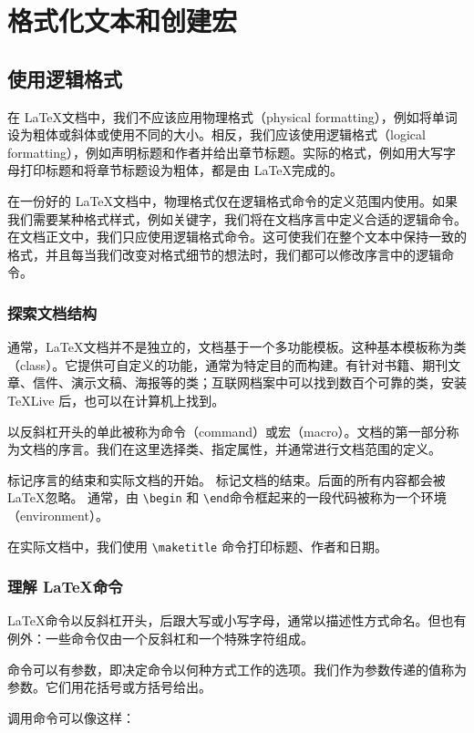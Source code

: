 \chapter{格式化文本和创建宏}
\section{使用逻辑格式}
在 \LaTeX 文档中，我们不应该应用物理格式（physical formatting），例如将单词设为粗体或斜体或使用不同的大小。相反，我们应该使用逻辑格式（logical formatting），例如声明标题和作者并给出章节标题。实际的格式，例如用大写字母打印标题和将章节标题设为粗体，都是由 \LaTeX 完成的。

在一份好的 \LaTeX 文档中，物理格式仅在逻辑格式命令的定义范围内使用。如果我们需要某种格式样式，例如关键字，我们将在文档序言中定义合适的逻辑命令。在文档正文中，我们只应使用逻辑格式命令。这可使我们在整个文本中保持一致的格式，并且每当我们改变对格式细节的想法时，我们都可以修改序言中的逻辑命令。
\subsection{探索文档结构}
通常，\LaTeX 文档并不是独立的，文档基于一个多功能模板。这种基本模板称为类（class）。它提供可自定义的功能，通常为特定目的而构建。有针对书籍、期刊文章、信件、演示文稿、海报等的类；互联网档案中可以找到数百个可靠的类，安装 TeXLive 后，也可以在计算机上找到。

以反斜杠开头的单此被称为命令（command）或宏（macro）。文档的第一部分称为文档的序言。我们在这里选择类、指定属性，并通常进行文档范围的定义。

\verb|| 标记序言的结束和实际文档的开始。 \verb|| 标记文档的结束。后面的所有内容都会被 \LaTeX 忽略。 通常，由 \verb|\begin| 和 \verb|\end|命令框起来的一段代码被称为一个环境（environment）。

在实际文档中，我们使用 \verb|\maketitle| 命令打印标题、作者和日期。
\subsection{理解 \LaTeX 命令}
\LaTeX 命令以反斜杠开头，后跟大写或小写字母，通常以描述性方式命名。但也有例外：一些命令仅由一个反斜杠和一个特殊字符组成。

命令可以有参数，即决定命令以何种方式工作的选项。我们作为参数传递的值称为参数。它们用花括号或方括号给出。

调用命令可以像这样：

